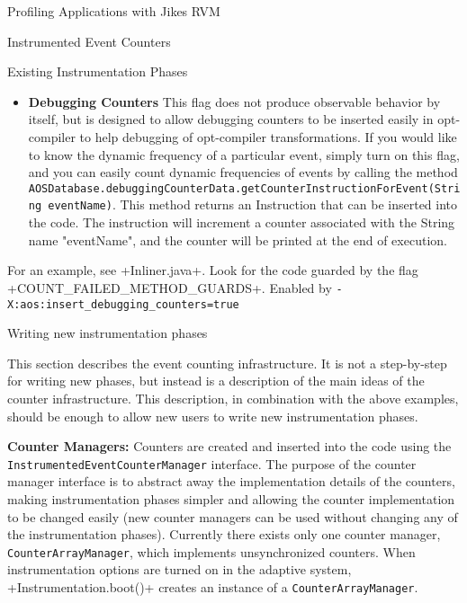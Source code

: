 \begin{chapter}{Profiling Applications with Jikes RVM}
\begin{section}{Instrumented Event Counters}
\begin{subsection}{Existing Instrumentation Phases}
\begin{itemize}
NOTE: Currently the counters are inserted at the end of HIR, so the counts \textit{will} capture the effect of HIR optimizations, and will not capture optimization that occurs in LIR or later.
  \item \textbf{Debugging Counters} This flag does not produce observable behavior by itself, but is designed to allow debugging counters to be inserted easily in opt-compiler to help debugging of opt-compiler transformations. If you would like to know the dynamic frequency of a particular event, simply turn on this flag, and you can easily count dynamic frequencies of events by calling the method \texttt{AOS\-Da\-ta\-base.de\-bug\-ging\-Coun\-ter\-Da\-ta.get\-Coun\-ter\-Instruction\-For\-Event(String eventName)}. This method returns an Instruction that can be inserted into the code. The instruction will increment a counter associated with the String name "eventName", and the counter will be printed at the end of execution.
\end{itemize}

For an example, see \spverb+Inliner.java+. Look for the code guarded by the flag \spverb+COUNT_FAILED_METHOD_GUARDS+. Enabled by \texttt{-X:aos:in\-sert\_de\-bugging\_coun\-ters=true}

\end{subsection}

\begin{subsection}{Writing new instrumentation phases}

This section describes the event counting infrastructure. It is not a step-by-step for writing new phases, but instead is a description of the main ideas of the counter infrastructure. This description, in combination with the above examples, should be enough to allow new users to write new instrumentation phases.

\textbf{Counter Managers:} Counters are created and inserted into the code using the \texttt{Instru\-men\-ted\-Event\-Coun\-ter\-Ma\-na\-ger} interface. The purpose of the counter manager interface is to abstract away the implementation details of the counters, making instrumentation phases simpler and allowing the counter implementation to be changed easily (new counter managers can be used without changing any of the instrumentation phases). Currently there exists only one counter manager, \texttt{Coun\-ter\-Array\-Ma\-na\-ger}, which implements unsynchronized counters. When instrumentation options are turned on in the adaptive system, \spverb+Instrumentation.boot()+ creates an instance of a \texttt{Coun\-ter\-Array\-Ma\-na\-ger}.


\end{subsection}
\end{section}
\end{chapter}
